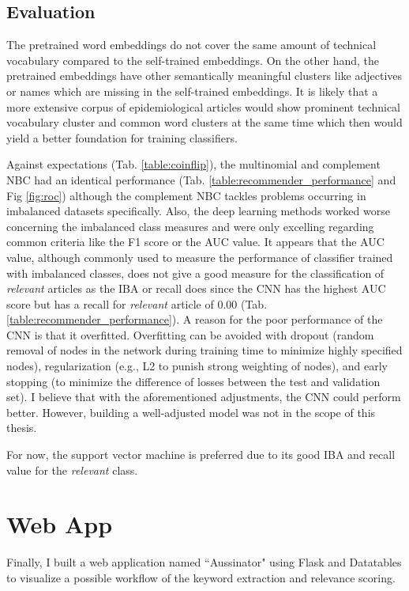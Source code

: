 \subsection{Evaluation}\label{eval_recommend}
  The pretrained word embeddings do not cover the same amount of technical vocabulary compared to the self-trained embeddings. On the other hand, the pretrained embeddings have other semantically meaningful clusters like adjectives or names which are missing in the self-trained embeddings.
  It is likely that a more extensive corpus of epidemiological articles would show prominent technical vocabulary cluster and common word clusters at the same time which then would yield a better foundation for training classifiers.

  Against expectations (Tab. \ref{table:coinflip}), the multinomial and complement NBC had an identical performance (Tab. \ref{table:recommender_performance} and Fig \ref{fig:roc}) although the complement NBC tackles problems occurring in imbalanced datasets specifically.
  Also, the deep learning methods worked worse concerning the imbalanced class measures and were only excelling regarding common criteria like the F1 score or the AUC value.
  It appears that the AUC value, although commonly used to measure the performance of classifier trained with imbalanced classes, does not give a good measure for the classification of \textsl{relevant} articles as the IBA or recall does since the CNN has the highest AUC score but has a recall for \textsl{relevant} article of 0.00 (Tab. \ref{table:recommender_performance}).
  A reason for the poor performance of the CNN is that it overfitted.
  Overfitting can be avoided with dropout (random removal of nodes in the network during training time to minimize highly specified nodes), regularization (e.g., L2 to punish strong weighting of nodes), and early stopping (to minimize the difference of losses between the test and validation set).
  I believe that with the aforementioned adjustments, the CNN could perform better.
  However, building a well-adjusted model was not in the scope of this thesis.

  For now, the support vector machine is preferred due to its good IBA and recall value for the \textsl{relevant} class.

\section{Web App}
  Finally, I built a web application named ``Aussinator" using Flask and Datatables to visualize a possible workflow of the keyword extraction and relevance scoring.

